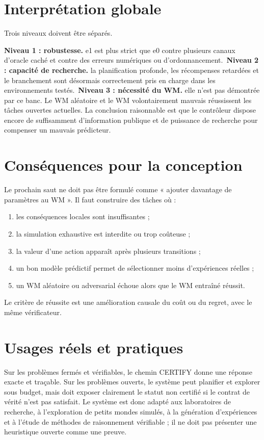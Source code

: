 \documentclass[11pt,a4paper]{article}
\begin{document}
\section{Interprétation globale}
Trois niveaux doivent être séparés.

\textbf{Niveau 1 : robustesse.} e1 est plus strict que e0 contre plusieurs canaux d'oracle caché et contre des erreurs numériques ou d'ordonnancement.\
\textbf{Niveau 2 : capacité de recherche.} la planification profonde, les récompenses retardées et le branchement sont désormais correctement pris en charge dans les environnements testés.\
\textbf{Niveau 3 : nécessité du WM.} elle n'est pas démontrée par ce banc. Le WM aléatoire et le WM volontairement mauvais réussissent les tâches ouvertes actuelles. La conclusion raisonnable est que le contrôleur dispose encore de suffisamment d'information publique et de puissance de recherche pour compenser un mauvais prédicteur.
\section{Conséquences pour la conception}
Le prochain saut ne doit pas être formulé comme « ajouter davantage de paramètres au WM ». Il faut construire des tâches où :
\begin{enumerate}
\item les conséquences locales sont insuffisantes ;
\item la simulation exhaustive est interdite ou trop coûteuse ;
\item la valeur d'une action apparaît après plusieurs transitions ;
\item un bon modèle prédictif permet de sélectionner moins d'expériences réelles ;
\item un WM aléatoire ou adversarial échoue alors que le WM entraîné réussit.
\end{enumerate}
Le critère de réussite est une amélioration causale du coût ou du regret, avec le même vérificateur.
\section{Usages réels et pratiques}
Sur les problèmes fermés et vérifiables, le chemin CERTIFY donne une réponse exacte et traçable. Sur les problèmes ouverts, le système peut planifier et explorer sous budget, mais doit exposer clairement le statut non certifié si le contrat de vérité n'est pas satisfait. Le système est donc adapté aux laboratoires de recherche, à l'exploration de petits mondes simulés, à la génération d'expériences et à l'étude de méthodes de raisonnement vérifiable ; il ne doit pas présenter une heuristique ouverte comme une preuve.
\end{document}
